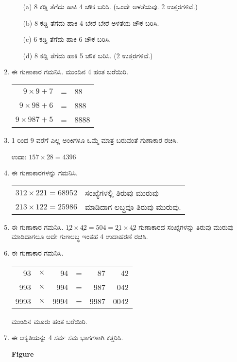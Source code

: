 \begin{enumerate}
\begin{itemize}
\item[(a)] 8 ಕಡ್ಡಿ ತೆಗೆದು ಹಾಕಿ 4 ಚೌಕ ಬರಿಸಿ. (ಒಂದೇ ಅಳತೆಯವು. 2 ಉತ್ತರಗಳಿವೆ.)
\item[(b)] 8 ಕಡ್ಡಿ ತೆಗೆದು ಹಾಕಿ 4 ಬೇರೆ ಬೇರೆ ಅಳತೆಯ ಚೌಕ ಬರಿಸಿ. 
\item[(c)] 6 ಕಡ್ಡಿ ತೆಗೆದು ಹಾಕಿ 6 ಚೌಕ ಬರಿಸಿ. 
\item[(d)] 8 ಕಡ್ಡಿ ತೆಗೆದು ಹಾಕಿ 5 ಚೌಕ ಬರಿಸಿ. (2 ಉತ್ತರಗಳಿವೆ.)
\end{itemize}

\item ಈ ಗುಣಾಕಾರ ಗಮನಿಸಿ. ಮುಂದಿನ 4 ಹಂತ ಬರೆಯಿರಿ. 

\begin{tabular}[t]{rcl}
$9\times 9 + 7$ & = & $88$\\
$9\times 98 + 6$ & = & $888$\\
$9\times 987 + 5$ & = & $8888$
\end{tabular}

\item 1 ರಿಂದ 9 ವರೆಗೆ ಎಲ್ಲ ಅಂಕಿಗಳೂ ಒಮ್ಮೆ ಮಾತ್ರ ಬರುವಂತೆ ಗುಣಾಕಾರ ರಚಿಸಿ. 

ಉದಾ: $157\times 28 = 4396$

\item ಈ ಗುಣಾಕಾರಗಳನ್ನು ಗಮನಿಸಿ. 

\begin{tabular}[t]{ll}
$312\times 221 = 68952$ & ಸಂಖ್ಯೆಗಳಲ್ಲಿ ತಿರುವು ಮುರುವು\\
$213\times 122 = 25986$ & ಮಾಡಿದಾಗ ಲಬ್ಧವೂ ತಿರುವು ಮುರುವು. 
\end{tabular}

\item ಈ ಗುಣಾಕಾರ ಗಮನಿಸಿ. $\underline{12}\times \underline{42} = 504 = \underline{21}\times \underline{42}$ ಗುಣಾಕಾರದ ಸಂಖ್ಯೆಗಳನ್ನು ತಿರುವು ಮುರುವು ಮಾಡಿದಾಗಲೂ ಅದೇ ಗುಣಲಬ್ಧ ಇಂತಹ 4 ಉದಾಹರಣೆ ರಚಿಸಿ. 

\item ಈ ಗುಣಾಕಾರ ಗಮನಿಸಿ. 

\begin{tabular}[t]{rcrcrr}
93 & $\times$ & 94 & = & 87 & 42\\
993 & $\times$ & 994 & = & 987 & 042\\
9993 & $\times$ & 9994 & = & 9987 & 0042\\
\end{tabular}

ಮುಂದಿನ ಮೂರು ಹಂತ ಬರೆಯಿರಿ. 

\item ಈ ಆಕೃತಿಯನ್ನು 4 ಸರ್ವ ಸಮ ಭಾಗಗಳಾಗಿ ಕತ್ತರಿಸಿ. 
\begin{center}
{\bf Figure}
\end{center}


\end{enumerate}
